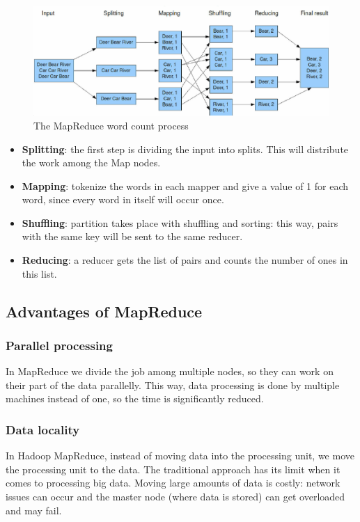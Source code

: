 \begin{figure}[H]
	\includegraphics[width=150mm, keepaspectratio]{figures/MapReduce_Example.png}
	\caption{The MapReduce word count process \cite{MapReduce-example-figure}}
	\centering
\end{figure}
\begin{itemize}
	\item \textbf{Splitting}: the first step is dividing the input into splits. This will distribute the work among the Map nodes.
	\item \textbf{Mapping}: tokenize the words in each mapper and give a value of 1 for each word, since every word in itself will occur once.
	\item \textbf{Shuffling}: partition takes place with shuffling and sorting: this way, pairs with the same key will be sent to the same reducer.
	\item \textbf{Reducing}: a reducer gets the list of pairs and counts the number of ones in this list.
\end{itemize}

\subsection{Advantages of MapReduce \cite{MapReduce-example}}
\subsubsection{Parallel processing}
In MapReduce we divide the job among multiple nodes, so they can work on their part of the data parallelly. This way, data processing is done by multiple machines instead of one, so the time is significantly reduced.
\subsubsection{Data locality}
In Hadoop MapReduce, instead of moving data into the processing unit, we move the processing unit to the data. The traditional approach has its limit when it comes to processing big data. Moving large amounts of data is costly: network issues can occur and the master node (where data is stored) can get overloaded and may fail. 


